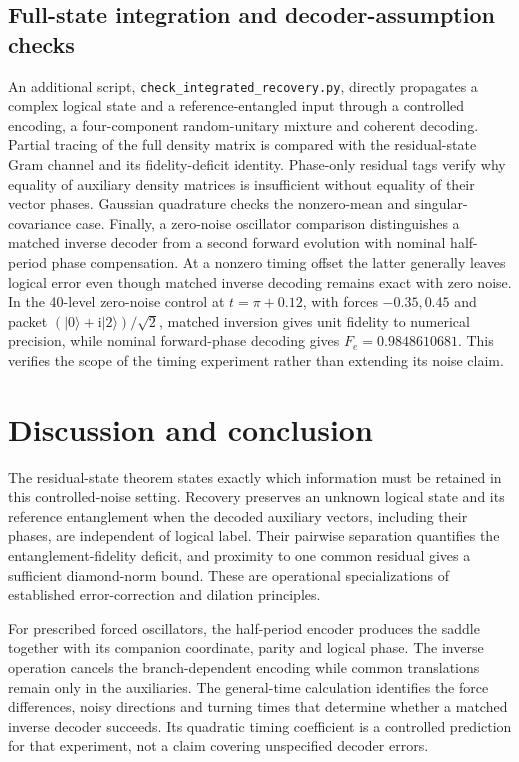 \documentclass[aip,adv,reprint,onecolumn,amsmath,amssymb]{revtex4-2}
\newcommand{\ii}{\mathrm i}
\newcommand{\ket}[1]{\lvert #1\rangle}
\begin{document}
\subsection{Full-state integration and decoder-assumption checks}
An additional script, \texttt{check\_integrated\_recovery.py}, directly propagates a complex logical state and a reference-entangled input through a controlled encoding, a four-component random-unitary mixture and coherent decoding. Partial tracing of the full density matrix is compared with the residual-state Gram channel and its fidelity-deficit identity. Phase-only residual tags verify why equality of auxiliary density matrices is insufficient without equality of their vector phases. Gaussian quadrature checks the nonzero-mean and singular-covariance case. Finally, a zero-noise oscillator comparison distinguishes a matched inverse decoder from a second forward evolution with nominal half-period phase compensation. At a nonzero timing offset the latter generally leaves logical error even though matched inverse decoding remains exact with zero noise. In the 40-level zero-noise control at $t=\pi+0.12$, with forces $-0.35,0.45$ and packet $(\ket0+\ii\ket2)/\sqrt2$, matched inversion gives unit fidelity to numerical precision, while nominal forward-phase decoding gives $F_e=0.9848610681$. This verifies the scope of the timing experiment rather than extending its noise claim.

\section{Discussion and conclusion}
The residual-state theorem states exactly which information must be retained in this controlled-noise setting. Recovery preserves an unknown logical state and its reference entanglement when the decoded auxiliary vectors, including their phases, are independent of logical label. Their pairwise separation quantifies the entanglement-fidelity deficit, and proximity to one common residual gives a sufficient diamond-norm bound. These are operational specializations of established error-correction and dilation principles.\cite{knill,kribs,ksw}

For prescribed forced oscillators, the half-period encoder produces the saddle together with its companion coordinate, parity and logical phase. The inverse operation cancels the branch-dependent encoding while common translations remain only in the auxiliaries. The general-time calculation identifies the force differences, noisy directions and turning times that determine whether a matched inverse decoder succeeds. Its quadratic timing coefficient is a controlled prediction for that experiment, not a claim covering unspecified decoder errors.
\end{document}
